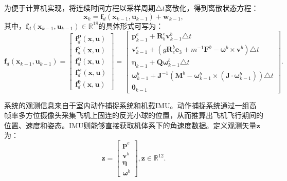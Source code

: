 为便于计算机实现，将连续时间方程以采样周期$\triangle t$离散化，得到离散状态方程：
\begin{equation}
    \boldsymbol{x}_k = \boldsymbol{f}_d(\boldsymbol{x}_{k-1}, \boldsymbol{u}_{k-1}) + \boldsymbol{w}_{k-1},
\end{equation}
其中，$\boldsymbol{f}_d(\boldsymbol{x}_{k-1}, \boldsymbol{u}_{k-1}) \in \mathbb{R}^{18}$的具体形式可写为：
\begin{equation}
    \boldsymbol{f}_d(\boldsymbol{x}_{k-1}, \boldsymbol{u}_{k-1}) = 
    \begin{bmatrix}
        \boldsymbol{f}_d^{\boldsymbol{p}}(\boldsymbol{x}, \boldsymbol{u}) \\
        \boldsymbol{f}_d^{\boldsymbol{v}}(\boldsymbol{x}, \boldsymbol{u}) \\
        \boldsymbol{f}_d^{\boldsymbol{\eta}}(\boldsymbol{x}, \boldsymbol{u}) \\
        \boldsymbol{f}_d^{\boldsymbol{\omega}}(\boldsymbol{x}, \boldsymbol{u}) \\
        \boldsymbol{f}_d^{\boldsymbol{\theta}}(\boldsymbol{x}, \boldsymbol{u})
    \end{bmatrix} =
    \begin{bmatrix}
        \boldsymbol{p}_{k-1}^e + \boldsymbol{R}_b^e \boldsymbol{v}_{k-1}^b \triangle t \\
        \boldsymbol{v}_{k-1}^e + (g\boldsymbol{R}_e^b \boldsymbol{e}_{3} +  m^{-1}\boldsymbol{F}^b - \boldsymbol{\omega}^b \times \boldsymbol{v}^b) \triangle t\\
        \boldsymbol{\eta}_{k-1} + \boldsymbol{Q}\boldsymbol{\omega}_{k-1}^b \triangle t \\
        \boldsymbol{\omega}_{k-1}^b + \boldsymbol{J}^{-1}(\boldsymbol{M}^b - \boldsymbol{\omega}_{k-1}^b\times(\boldsymbol{J}\cdot\boldsymbol{\omega}_{k-1}^b)) \triangle t \\
        \boldsymbol{\theta}_{k-1}
    \end{bmatrix}.
    \label{eq:f_d}
\end{equation}

系统的观测信息来自于室内动作捕捉系统和机载IMU。动作捕捉系统通过一组高帧率多方位摄像头采集飞机上固连的反光小球的位置，从而推算出飞机飞行期间的位置、速度和姿态。IMU则能够直接获取机体系下的角速度数据。定义观测矢量$\boldsymbol{z}$为：
\begin{equation}
    \boldsymbol{z} = 
    \begin{bmatrix}
        \boldsymbol{p}^e \\
        \boldsymbol{v}^b \\
        \boldsymbol{\eta} \\
        \boldsymbol{\omega}^b
    \end{bmatrix},
    \boldsymbol{z} \in \mathbb{R}^{12}.
\end{equation}

